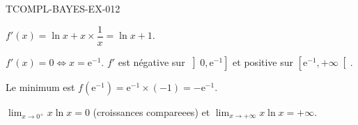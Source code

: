 \begin{corrige}{TCOMPL-BAYES-EX-012}

$f'(x) = \ln x + x \times \dfrac{1}{x} = \ln x + 1$.


$f'(x) = 0 \iff x = \mathrm{e}^{-1}$. $f'$ est négative sur $\left]0, \mathrm{e}^{-1}\right]$ et positive sur $\left[\mathrm{e}^{-1}, +\infty\right[$.

Le minimum est $f(\mathrm{e}^{-1}) = \mathrm{e}^{-1} \times (-1) = -\mathrm{e}^{-1}$.

$\lim_{x \to 0^+} x\ln x = 0$ (croissances compareees) et $\lim_{x \to +\infty} x\ln x = +\infty$.

\end{corrige}
